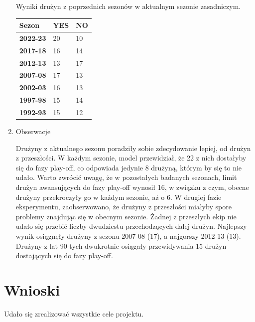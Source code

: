 \documentclass{article}
\begin{document}
\begin{enumerate}
        Wyniki drużyn z poprzednich sezonów w aktualnym sezonie zasadniczym.
        
        \begin{table}[H]
            \centering
            \begin{tabular}{|l|l|l|}
            \hline
            \textbf{Sezon} & \textbf{YES} & \textbf{NO}  \\ \hline
            \textbf{2022-23} & 20 & 10  \\ \hline
            \textbf{2017-18} & 16 & 14  \\ \hline
            \textbf{2012-13} & 13 & 17  \\ \hline
            \textbf{2007-08} & 17 & 13  \\ \hline
            \textbf{2002-03} & 16 & 13  \\ \hline
            \textbf{1997-98} & 15 & 14  \\ \hline
            \textbf{1992-93} & 15 & 12  \\ \hline
            \end{tabular}
        \end{table}

        \item Obserwacje

        Drużyny z aktualnego sezonu poradziły sobie zdecydowanie lepiej, od drużyn z przeszłości. W każdym sezonie, model przewidział, że 22 z nich dostałyby się do fazy play-off, co odpowiada jedynie 8 drużyną, którym by się to nie udało. Warto zwrócić uwagę, że w pozostałych badanych sezonach, limit drużyn awansujących do fazy play-off wynosił 16, w związku z czym, obecne drużyny przekroczyły go w każdym sezonie, aż o 6. W drugiej fazie eksperymentu, zaobserwowano, że drużyny z przeszłości miałyby spore problemy znajdując się w obecnym sezonie. Żadnej z przeszłych ekip nie udało się przebić liczby dwudziestu przechodzących dalej drużyn. Najlepszy wynik osiągnęły drużyny z sezonu 2007-08 (17), a najgorszy 2012-13 (13). Drużyny z lat 90-tych dwukrotnie osiągały przewidywania 15 drużyn dostających się do fazy play-off.
        
    \end{enumerate}
    


\section{Wnioski}

Udało się zrealizować wszystkie cele projektu.
\end{document}
